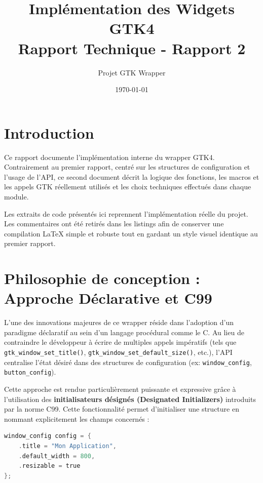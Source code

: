 \documentclass[12pt,a4paper]{article}
\title{Implémentation des Widgets GTK4 \\ Rapport Technique - Rapport 2}
\author{Projet GTK Wrapper}
\date{\today}
\begin{document}


\maketitle

\tableofcontents

\newpage

\section{Introduction}
Ce rapport documente l'implémentation interne du wrapper GTK4. Contrairement au premier rapport, centré sur les structures de configuration et l'usage de l'API, ce second document décrit la logique des fonctions, les macros et les appels GTK réellement utilisés et les choix techniques effectués dans chaque module.

Les extraits de code présentés ici reprennent l'implémentation réelle du projet. Les commentaires ont été retirés dans les listings afin de conserver une compilation LaTeX simple et robuste tout en gardant un style visuel identique au premier rapport.

\section{Philosophie de conception : Approche Déclarative et C99}

L'une des innovations majeures de ce wrapper réside dans l'adoption d'un paradigme déclaratif au sein d'un langage procédural comme le C. Au lieu de contraindre le développeur à écrire de multiples appels impératifs (tels que \texttt{gtk\_window\_set\_title()}, \texttt{gtk\_window\_set\_default\_size()}, etc.), l'API centralise l'état désiré dans des structures de configuration (ex: \texttt{window\_config}, \texttt{button\_config}).

Cette approche est rendue particulièrement puissante et expressive grâce à l'utilisation des \textbf{initialisateurs désignés (Designated Initializers)} introduits par la norme C99. Cette fonctionnalité permet d'initialiser une structure en nommant explicitement les champs concernés :

\begin{lstlisting}[language=C]
window_config config = {
    .title = "Mon Application",
    .default_width = 800,
    .resizable = true
};
\end{lstlisting}
\end{document}

